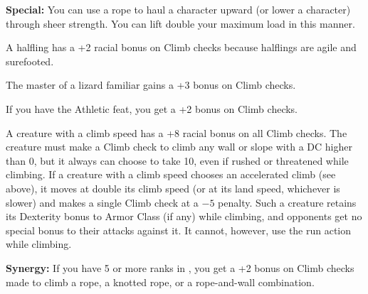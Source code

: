 \textbf{Special:} You can use a rope to haul a character upward (or lower a character) through sheer strength. You can lift double your maximum load in this manner.

A halfling has a +2 racial bonus on Climb checks because halflings are agile and surefooted.

The master of a lizard familiar gains a +3 bonus on Climb checks.

If you have the Athletic feat, you get a +2 bonus on Climb checks.

A creature with a climb speed has a +8 racial bonus on all Climb checks. The creature must make a Climb check to climb any wall or slope with a DC higher than 0, but it always can choose to take 10, even if rushed or threatened while climbing. If a creature with a climb speed chooses an accelerated climb (see above), it moves at double its climb speed (or at its land speed, whichever is slower) and makes a single Climb check at a $-5$ penalty. Such a creature retains its Dexterity bonus to Armor Class (if any) while climbing, and opponents get no special bonus to their attacks against it. It cannot, however, use the run action while climbing.

\textbf{Synergy:} If you have 5 or more ranks in , you get a +2 bonus on Climb checks made to climb a rope, a knotted rope, or a rope-and-wall combination.